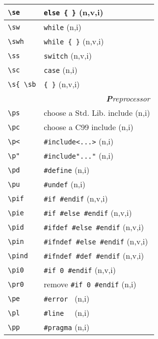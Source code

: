 \documentclass[oneside,11pt,landscape,DIV17]{scrartcl}
\begin{document}
\begin{multicols}{3}
\begin{center}
\begin{tabular}[]{|p{15mm}|p{55mm}|}
\hline \verb'\se'  & \verb'else { }'            \hfill (n,v,i)\\
\hline \verb'\sw'  & \verb'while'               \hfill (n,i)\\
\hline \verb'\swh' & \verb'while { }'           \hfill (n,v,i)\\
\hline \verb'\ss'  & \verb'switch'              \hfill (n,v,i)\\
\hline \verb'\sc'  & \verb'case'                \hfill (n,i)\\
\hline \verb'\s{ \sb'  & \verb'{ }'             \hfill (n,v,i)\\
\hline
\hline
\multicolumn{2}{|r|}{\textsl{\textbf{P}reprocessor}}   \\
\hline \verb'\ps'   & choose a Std. Lib. include    \hfill (n,i)\\
\hline \verb'\pc'   & choose a C99 include         \hfill (n,i)\\
\hline \verb'\p<'   & \verb$#include<...>$         \hfill (n,i)\\
\hline \verb'\p"'   & \verb$#include"..."$         \hfill (n,i)\\
\hline \verb'\pd'   & \verb'#define'               \hfill (n,i)\\
\hline \verb'\pu'   & \verb'#undef'                \hfill (n,i)\\
\hline \verb'\pif'  & \verb'#if #endif'            \hfill (n,v,i)\\
\hline \verb'\pie'  & \verb'#if #else #endif'      \hfill (n,v,i)\\
\hline \verb'\pid'  & \verb'#ifdef #else #endif'   \hfill (n,v,i)\\
\hline \verb'\pin'  & \verb'#ifndef #else #endif'  \hfill (n,v,i)\\
\hline \verb'\pind' & \verb'#ifndef #def #endif'   \hfill (n,v,i)\\
\hline \verb'\pi0'  & \verb'#if 0 #endif'          \hfill (n,v,i)\\
\hline \verb'\pr0'  & remove \verb'#if 0 #endif'   \hfill (n,i)\\
\hline \verb'\pe'   & \verb'#error '               \hfill (n,i)\\
\hline \verb'\pl'   & \verb'#line  '               \hfill (n,i)\\
\hline \verb'\pp'   & \verb'#pragma'               \hfill (n,i)\\
\hline
\end{tabular} \\


\end{center}
\end{multicols}
\end{document}
